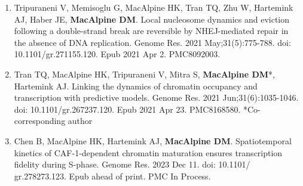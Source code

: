 \begin{statement}
\begin{enumerate}
\item Tripuraneni V, Memisoglu G, MacAlpine HK, Tran TQ, Zhu W, Hartemink AJ, Haber JE, \textbf{MacAlpine DM}. Local nucleosome dynamics and eviction following a double-strand break are reversible by NHEJ-mediated repair in the absence of DNA replication. Genome Res. 2021 May;31(5):775-788. doi: 10.1101/gr.271155.120. Epub 2021 Apr 2. PMC8092003.

\item Tran TQ, MacAlpine HK, Tripuraneni V, Mitra S, \textbf{MacAlpine DM}*, Hartemink AJ. Linking the dynamics of chromatin occupancy and transcription with predictive models. Genome Res. 2021 Jun;31(6):1035-1046. doi: 10.1101/gr.267237.120. Epub 2021 Apr 23. PMC8168580. *Co-corresponding author


\item Chen B, MacAlpine HK, Hartemink AJ, \textbf{MacAlpine DM}. Spatiotemporal kinetics of CAF-1-dependent chromatin maturation ensures transcription fidelity during S-phase. Genome Res. 2023 Dec 11. doi: 10.1101/ gr.278273.123. Epub ahead of print. PMC In Process.

\end{enumerate}

\end{statement}